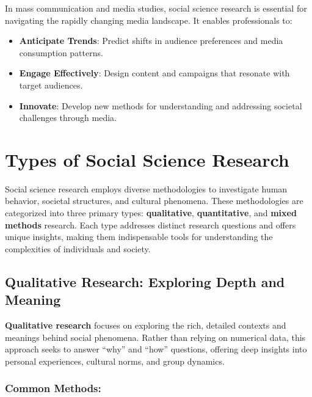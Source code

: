 \documentclass[
]{book}
\providecommand{\tightlist}{%
  \setlength{\itemsep}{0pt}\setlength{\parskip}{0pt}}
\begin{document}
In mass communication and media studies, social science research is essential for navigating the rapidly changing media landscape. It enables professionals to:

\begin{itemize}
\tightlist
\item
  \textbf{Anticipate Trends}: Predict shifts in audience preferences and media consumption patterns.
\item
  \textbf{Engage Effectively}: Design content and campaigns that resonate with target audiences.
\item
  \textbf{Innovate}: Develop new methods for understanding and addressing societal challenges through media.
\end{itemize}

\section{Types of Social Science Research}\label{types-of-social-science-research}

Social science research employs diverse methodologies to investigate human behavior, societal structures, and cultural phenomena. These methodologies are categorized into three primary types: \textbf{qualitative}, \textbf{quantitative}, and \textbf{mixed methods} research. Each type addresses distinct research questions and offers unique insights, making them indispensable tools for understanding the complexities of individuals and society.

\subsection*{Qualitative Research: Exploring Depth and Meaning}\label{qualitative-research-exploring-depth-and-meaning}

\textbf{Qualitative research} focuses on exploring the rich, detailed contexts and meanings behind social phenomena. Rather than relying on numerical data, this approach seeks to answer ``why'' and ``how'' questions, offering deep insights into personal experiences, cultural norms, and group dynamics.

\subsubsection*{Common Methods:}\label{common-methods}
\end{document}
